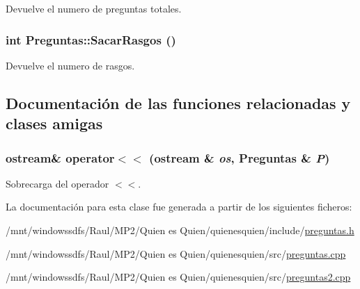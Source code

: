 Devuelve el numero de preguntas totales. 

\hypertarget{class_preguntas_4e3802ae1037d3837087242c9185fee7}{
\subsubsection[{SacarRasgos}]{\setlength{\rightskip}{0pt plus 5cm}int Preguntas::SacarRasgos ()}}
\label{class_preguntas_4e3802ae1037d3837087242c9185fee7}


Devuelve el numero de rasgos. 



\subsection{Documentación de las funciones relacionadas y clases amigas}
\hypertarget{class_preguntas_f29ae837f1cb90c2cb050c3ef9247a0d}{
\subsubsection[{operator$<$$<$}]{\setlength{\rightskip}{0pt plus 5cm}ostream\& operator$<$$<$ (ostream \& {\em os}, \/  {\bf Preguntas} \& {\em P})}}
\label{class_preguntas_f29ae837f1cb90c2cb050c3ef9247a0d}


Sobrecarga del operador $<$$<$. 



La documentación para esta clase fue generada a partir de los siguientes ficheros:\begin{CompactItemize}
\item 
/mnt/windowssdfs/Raul/MP2/Quien es Quien/quienesquien/include/\hyperlink{preguntas_8h}{preguntas.h}\item 
/mnt/windowssdfs/Raul/MP2/Quien es Quien/quienesquien/src/\hyperlink{preguntas_8cpp}{preguntas.cpp}\item 
/mnt/windowssdfs/Raul/MP2/Quien es Quien/quienesquien/src/\hyperlink{preguntas2_8cpp}{preguntas2.cpp}\end{CompactItemize}
